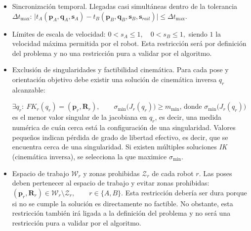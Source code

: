 \begin{itemize}









  \item Sincronización temporal. Llegadas casi simultáneas dentro de la tolerancia \(\Delta t_{\max}\):
  $\big|t_A(\mathbf{p}_A,\mathbf{q}_A,\mathbf{s}_A)-t_B(\mathbf{p}_B,\mathbf{q}_B,\mathbf{s}_B,\mathbf{s}_{rail})\big| \le \Delta t_{\max}$.

  \item Límites de escala de velocidad: 
  $0 < s_A \le 1,\quad 0 < s_B \le 1,$
  siendo $1$ la velocidad máxima permitida por el robot. Esta restricción será por definición 
  del problema y no una restricción pura a validar por el algoritmo.

  \item Exclusión de singularidades y factibilidad cinemática.
  Para cada pose y orientación objetivo debe existir una solución de cinemática 
  inversa \(q_r\) alcanzable:

  $\exists q_r:\ FK_r(q_r)=(\mathbf{p}_r,\mathbf{R}_r),\qquad
  \sigma_{\min}\big(J_r(q_r)\big)\ge m_{\min}$,
  donde $\sigma_{\min}\big(J_r(q_r)\big)$ es el menor valor singular de la jacobiana en 
  $q_r$, es decir, una medida numérica de cuán cerca está la configuración de una singularidad.
  Valores pequeños indican pérdida de grado de libertad efectivo, es decir, que se 
  encuentra cerca de una singularidad. Si existen múltiples soluciones \textit{IK}
  (cinemática inversa), se selecciona la que maximice \(\sigma_{\min}\).

  \item Espacio de trabajo $\mathcal{W}_r$ y zonas prohibidas $\mathcal{Z}_{r}$ de 
  cada robot $r$.
  Las poses deben pertenecer al espacio de trabajo y evitar zonas prohibidas:
  $
  (\mathbf{p}_r,\mathbf{R}_r)\in\mathcal{W}_r\setminus\mathcal{Z}_{r},\qquad r\in\{A,B\}.
  $ Esta restricción debería ser dura porque si no se cumple la solución es directamente 
  no factible. No obstante, esta restricción también irá ligada a la definición 
  del problema y no será una restricción pura a validar por el algoritmo.

\end{itemize}

